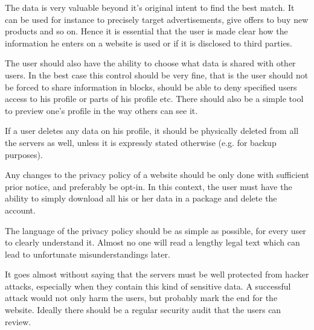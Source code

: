 \documentclass[12pt,oneside]{fithesis}
\begin{document}
	The data is very valuable beyond it's original intent to find the best match. It can be used for instance to precisely target advertisements, give offers to buy new products and so on. Hence it is essential that the user is made clear how the information he enters on a website is used or if it is disclosed to third parties.
	
	The user should also have the ability to choose what data is shared with other users. In the best case this control should be very fine, that is the user should not be forced to share information in blocks, should be able to deny specified users access to his profile or parts of his profile etc. There should also be a simple tool to preview one's profile in the way others can see it.
	
	If a user deletes any data on his profile, it should be physically deleted from all the servers as well, unless it is expressly stated otherwise (e.g. for backup purposes).
	
	Any changes to the privacy policy of a website should be only done with sufficient prior notice, and preferably be opt-in. In this context, the user must have the ability to simply download all his or her data in a package and delete the account.
	
	The language of the privacy policy should be as simple as possible, for every user to clearly understand it. Almost no one will read a lengthy legal text which can lead to unfortunate misunderstandings later.
	
	It goes almost without saying that the servers must be well protected from hacker attacks, especially when they contain this kind of sensitive data. A successful attack would not only harm the users, but probably mark the end for the website. Ideally there should be a regular security audit that the users can review.
\end{document}
